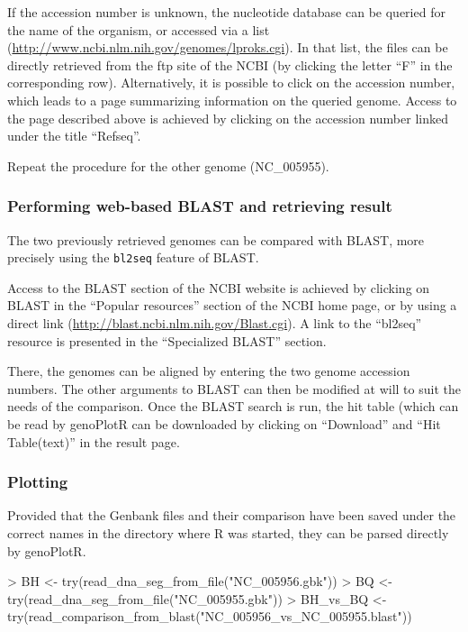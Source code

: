\documentclass[a4paper]{article}
\newcommand{\code}[1]{\texttt{#1}}
\newcommand{\pkg}[1]{{\normalfont\fontseries{b}\selectfont #1}}
\newcommand{\genoPlotR}{\pkg{genoPlotR}}
\begin{document}
If the accession number is unknown, the nucleotide database can be queried
for the name of the organism, or accessed via a list 
(\url{http://www.ncbi.nlm.nih.gov/genomes/lproks.cgi}). In that list, the files
can be directly retrieved from the ftp site of the NCBI (by clicking the letter
``F'' in the corresponding row). Alternatively, it is possible to click 
on the accession number, which leads to a page summarizing information on
the queried genome. Access to the page described above is achieved by clicking
on the accession number linked under the title ``Refseq''. 

Repeat the procedure for the other genome (NC\_005955).

\subsubsection{Performing web-based BLAST and retrieving result}

The two previously retrieved genomes can be compared with BLAST, more
precisely using the \code{bl2seq} feature of BLAST.

Access to the BLAST section of the NCBI website is achieved by clicking on
BLAST in the ``Popular resources'' section of the NCBI home page, or by using
a direct link (\url{http://blast.ncbi.nlm.nih.gov/Blast.cgi}). A link to
the ``bl2seq'' resource is presented in the ``Specialized BLAST'' section.

There, the genomes can be aligned by entering the two genome accession 
numbers. The other arguments to BLAST can then be modified at will to suit 
the needs of the comparison. Once the BLAST search is run, the hit table 
(which can be read by \genoPlotR{} can be downloaded by clicking on
``Download'' and ``Hit Table(text)'' in the result page.

\subsubsection{Plotting}

Provided that the Genbank files and their comparison have been saved
under the correct names in the directory where R was started, 
they can be parsed directly by \genoPlotR{}.

\begin{Schunk}
\begin{Sinput}
> BH <- try(read_dna_seg_from_file("NC_005956.gbk"))
> BQ <- try(read_dna_seg_from_file("NC_005955.gbk"))
> BH_vs_BQ <- try(read_comparison_from_blast("NC_005956_vs_NC_005955.blast"))
\end{Sinput}
\end{Schunk}
\end{document}
